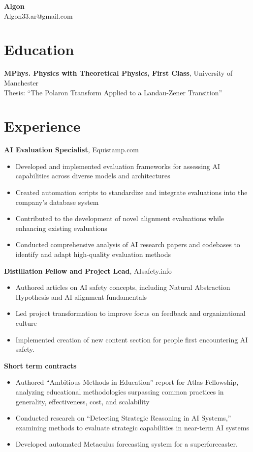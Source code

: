 \documentclass{article}
\begin{document}
\vspace*{-40pt}
\begin{center}
\huge\textbf{Algon}\\[3pt]
\small Algon33.ar@gmail.com
\end{center}

\vspace{6pt}

\section*{Education}
\textbf{MPhys. Physics with Theoretical Physics, First Class}, University of Manchester\\
Thesis: ``The Polaron Transform Applied to a Landau-Zener Transition''

\section*{Experience}
\textbf{AI Evaluation Specialist}, Equistamp.com
\begin{itemize}[leftmargin=*]
\item Developed and implemented evaluation frameworks for assessing AI capabilities across diverse models and architectures
\item Created automation scripts to standardize and integrate evaluations into the company's database system
\item Contributed to the development of novel alignment evaluations while enhancing existing evaluations
\item Conducted comprehensive analysis of AI research papers and codebases to identify and adapt high-quality evaluation methods
\end{itemize}



\textbf{Distillation Fellow and Project Lead}, AIsafety.info
\begin{itemize}[leftmargin=*]
\item Authored articles on AI safety concepts, including Natural Abstraction Hypothesis and AI alignment fundamentals
\item Led project transformation to improve focus on feedback and organizational culture
\item Implemented creation of new content section for people first encountering AI safety. 
\end{itemize}

\textbf{Short term contracts}
\begin{itemize}[leftmargin=*]
\item Authored ``Ambitious Methods in Education'' report for Atlas Fellowship, analyzing educational methodologies surpassing common practices in generality, effectiveness, cost, and scalability
\item Conducted research on ``Detecting Strategic Reasoning in AI Systems,'' examining methods to evaluate strategic capabilities in near-term AI systems
\item Developed automated Metaculus forecasting system for a superforecaster.
\end{itemize}
\end{document}
